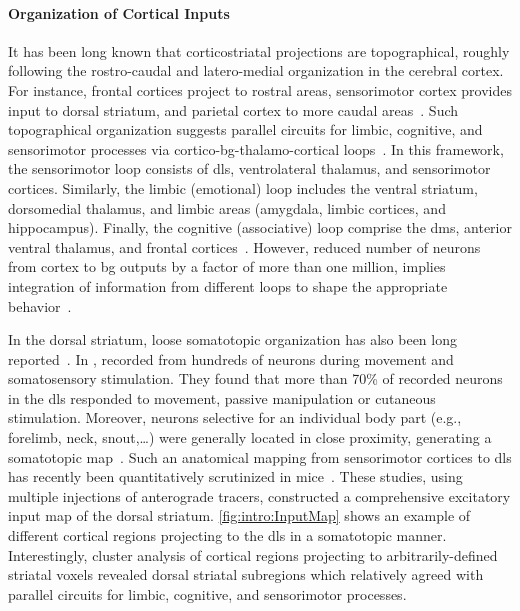 \paragraph{Organization of Cortical Inputs}
It has been long known that corticostriatal projections are topographical, roughly following the rostro-caudal and latero-medial organization in the cerebral cortex.
For instance, frontal cortices project to rostral areas, sensorimotor cortex provides input to dorsal striatum, and parietal cortex to more caudal areas~\cite{Dudman2015Book}.
Such topographical organization suggests parallel circuits for limbic, cognitive, and sensorimotor processes via cortico-\gls{bg}-thalamo-cortical loops~\cite{Alexander1986}.
In this framework, the sensorimotor loop consists of \gls{dls}, ventrolateral thalamus, and sensorimotor cortices.
Similarly, the limbic (emotional) loop includes the ventral striatum, dorsomedial thalamus, and limbic areas (amygdala, limbic cortices, and hippocampus).
Finally, the cognitive (associative) loop comprise the \gls{dms}, anterior ventral thalamus, and frontal cortices~\cite{Jahanshahi2015NatRevNeurosci}.
However, reduced number of neurons from cortex to \gls{bg} outputs by a factor of more than one million, implies integration of information from different loops to shape the appropriate behavior~\cite{Boraud2018ProgNeurobiol}.
\par
In the dorsal striatum, loose somatotopic organization has also been long reported~\cite[see][as an early review]{Mink1996}.
In \citeyear{Carelli1991}, \citeauthor{Carelli1991} recorded from hundreds of neurons during movement and somatosensory stimulation.
They found that more than 70\% of recorded neurons in the \gls{dls} responded to movement, passive manipulation or cutaneous stimulation.
Moreover, neurons selective for an individual body part (e.g., forelimb, neck, snout,\dots) were generally located in close proximity, generating a somatotopic map~\cite{Carelli1991}.
Such an anatomical mapping from sensorimotor cortices to \gls{dls} has recently been quantitatively scrutinized in mice~\cite{Hunnicutt2016, Hintiryan2016NN}.
These studies, using multiple injections of anterograde tracers, constructed a comprehensive excitatory input map of the dorsal striatum.
\autoref{fig:intro:InputMap} shows an example of different cortical regions projecting to the \gls{dls} in a somatotopic manner.
Interestingly, cluster analysis of cortical regions projecting to arbitrarily-defined striatal voxels revealed dorsal striatal subregions which relatively agreed with parallel circuits for limbic, cognitive, and sensorimotor processes.
